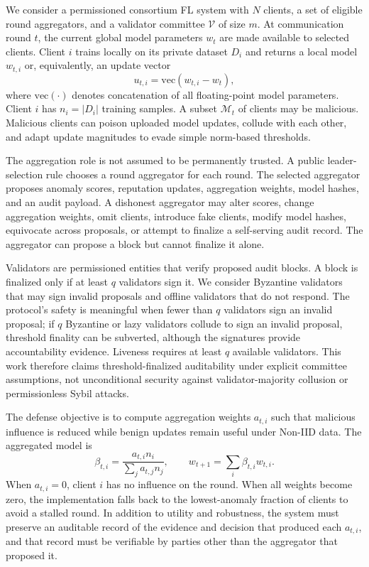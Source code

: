\documentclass[preprint,authoryear,12pt]{elsarticle}
\begin{document}
We consider a permissioned consortium FL system with $N$ clients, a set of eligible round aggregators, and a validator committee $\mathcal{V}$ of size $m$. At communication round $t$, the current global model parameters $w_t$ are made available to selected clients. Client $i$ trains locally on its private dataset $D_i$ and returns a local model $w_{t,i}$ or, equivalently, an update vector
\begin{equation}
u_{t,i}=\mathrm{vec}(w_{t,i}-w_t),
\end{equation}
where $\mathrm{vec}(\cdot)$ denotes concatenation of all floating-point model parameters. Client $i$ has $n_i=|D_i|$ training samples. A subset $\mathcal{M}_t$ of clients may be malicious. Malicious clients can poison uploaded model updates, collude with each other, and adapt update magnitudes to evade simple norm-based thresholds.

The aggregation role is not assumed to be permanently trusted. A public leader-selection rule chooses a round aggregator for each round. The selected aggregator proposes anomaly scores, reputation updates, aggregation weights, model hashes, and an audit payload. A dishonest aggregator may alter scores, change aggregation weights, omit clients, introduce fake clients, modify model hashes, equivocate across proposals, or attempt to finalize a self-serving audit record. The aggregator can propose a block but cannot finalize it alone.

Validators are permissioned entities that verify proposed audit blocks. A block is finalized only if at least $q$ validators sign it. We consider Byzantine validators that may sign invalid proposals and offline validators that do not respond. The protocol's safety is meaningful when fewer than $q$ validators sign an invalid proposal; if $q$ Byzantine or lazy validators collude to sign an invalid proposal, threshold finality can be subverted, although the signatures provide accountability evidence. Liveness requires at least $q$ available validators. This work therefore claims threshold-finalized auditability under explicit committee assumptions, not unconditional security against validator-majority collusion or permissionless Sybil attacks.

The defense objective is to compute aggregation weights $a_{t,i}$ such that malicious influence is reduced while benign updates remain useful under Non-IID data. The aggregated model is
\begin{equation}
\beta_{t,i}=\frac{a_{t,i}n_i}{\sum_j a_{t,j}n_j}, \qquad
w_{t+1}=\sum_i \beta_{t,i}w_{t,i}.
\end{equation}
When $a_{t,i}=0$, client $i$ has no influence on the round. When all weights become zero, the implementation falls back to the lowest-anomaly fraction of clients to avoid a stalled round. In addition to utility and robustness, the system must preserve an auditable record of the evidence and decision that produced each $a_{t,i}$, and that record must be verifiable by parties other than the aggregator that proposed it.
\end{document}
